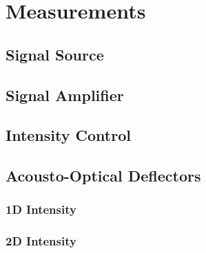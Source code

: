 \chapter{Measurements}

\section{Signal Source}

\section{Signal Amplifier}


\section{Intensity Control}


\section{Acousto-Optical Deflectors}

\subsection{1D Intensity}




\subsection{2D Intensity}

